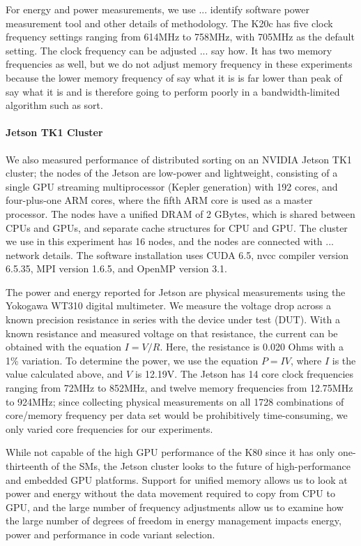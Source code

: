 For energy and power measurements, we use {\color{red} 
... identify software power
measurement tool and other details of methodology}.  The K20c has five clock frequency settings ranging from 614MHz to 758MHz, with 705MHz as the default setting.
The clock frequency can be adjusted 
{\color{red} ... say how}.  It has two memory frequencies as well, 
but we do not adjust memory frequency in these experiments 
because the lower memory frequency of {\color{red} say what it is}
is far lower than peak of {\color{red} say what it is}
and is therefore going to perform poorly in a bandwidth-limited
algorithm such as sort.

\paragraph{Jetson TK1 Cluster}
We also measured performance of distributed sorting on an NVIDIA 
Jetson TK1 cluster; the nodes of the Jetson are low-power and lightweight,
consisting of a single GPU streaming multiprocessor (Kepler generation)
with 192 cores, and 
four-plus-one ARM cores, where the fifth ARM core is used as a master processor.
The nodes have a unified DRAM of 2 GBytes, which is shared between CPUs and
GPUs, and separate cache structures for CPU and GPU.
The cluster we use in this experiment has 16 nodes, and
the nodes are connected with {\color{red} ... network details.}
The software installation uses CUDA 6.5, nvcc compiler version 6.5.35,
MPI version 1.6.5, and OpenMP version 3.1.

The power and energy reported for
Jetson are physical measurements  
using the Yokogawa WT310 digital multimeter.
We measure the voltage drop across a known precision resistance in series with the device under test (DUT).
With a known resistance and measured voltage on that resistance,
the current can be obtained with the equation $I=V/R$.
Here, the resistance is 0.020 Ohms with a 1\% variation.
To determine the power, we use the equation $P=IV$, where $I$ is the value calculated above, and $V$ is 12.19V.
The Jetson has 14 core clock frequencies ranging from 72MHz to 852MHz,
and twelve memory frequencies from 12.75MHz to 924MHz;
since collecting physical measurements 
on all 1728 combinations of core/memory frequency per data set would 
be prohibitively time-consuming, we only varied core frequencies for our experiments.

While not capable of the high GPU performance of the K80
since it has only one-thirteenth of the SMs,
the Jetson cluster looks to the future of high-performance and 
embedded GPU platforms. Support for unified memory allows us to look 
at power and energy without the data movement required to copy
from CPU to GPU, and the large number of frequency adjustments
allow us to examine how the large number of degrees of freedom
in energy management impacts energy, power and performance in 
code variant selection. 
